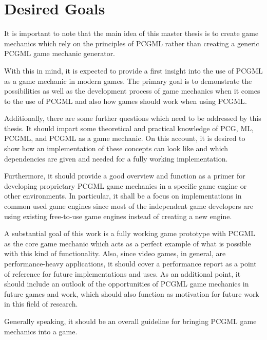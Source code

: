 \documentclass[MGS,Master,english]{twbook}%
\begin{document}
\section{Desired Goals}
It is important to note that the main idea of this master thesis is to create game mechanics which rely on the principles of \ac{PCGML} rather than creating a generic \ac{PCGML} game mechanic generator.

With this in mind, it is expected to provide a first insight into the use of \ac{PCGML} as a game mechanic in modern games. The primary goal is to demonstrate the possibilities as well as the development process of game mechanics when it comes to the use of \ac{PCGML} and also how games should work when using \ac{PCGML}.

Additionally, there are some further questions which need to be addressed by this thesis. It should impart some theoretical and practical knowledge of \ac{PCG}, \ac{ML}, \ac{PCGML}, and \ac{PCGML} as a game mechanic. On this account, it is desired to show how an implementation of these concepts can look like and which dependencies are given and needed for a fully working implementation. 

Furthermore, it should provide a good overview and function as a primer for developing proprietary \ac{PCGML} game mechanics in a specific game engine or other environments. In particular, it shall be a focus on implementations in common used game engines since most of the independent game developers are using existing free-to-use game engines instead of creating a new engine. 

A substantial goal of this work is a fully working game prototype with \ac{PCGML} as the core game mechanic which acts as a perfect example of what is possible with this kind of functionality. Also, since video games, in general, are performance-heavy applications, it should cover a performance report as a point of reference for future implementations and uses. As an additional point, it should include an outlook of the opportunities of \ac{PCGML} game mechanics in future games and work, which should also function as motivation for future work in this field of research.

Generally speaking, it should be an overall guideline for bringing \ac{PCGML} game mechanics into a game.
\end{document}
